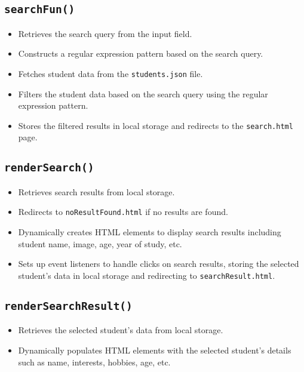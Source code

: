 \documentclass[12pt,a4paper]{article}
\begin{document}
\subsection{\texttt{searchFun()}}
\begin{itemize}
\item Retrieves the search query from the input field.
\item Constructs a regular expression pattern based on the search query.
\item Fetches student data from the \texttt{students.json} file.
\item Filters the student data based on the search query using the regular expression pattern.
\item Stores the filtered results in local storage and redirects to the \texttt{search.html} page.
\end{itemize}

\subsection{\texttt{renderSearch()}}
\begin{itemize}
\item Retrieves search results from local storage.
\item Redirects to \texttt{noResultFound.html} if no results are found.
\item Dynamically creates HTML elements to display search results including student name, image, age, year of study, etc.
\item Sets up event listeners to handle clicks on search results, storing the selected student's data in local storage and redirecting to \texttt{searchResult.html}.
\end{itemize}

\subsection{\texttt{renderSearchResult()}}
\begin{itemize}
\item Retrieves the selected student's data from local storage.
\item Dynamically populates HTML elements with the selected student's details such as name, interests, hobbies, age, etc.
\end{itemize}






% 
% 
% 
% 
% 
\end{document}
